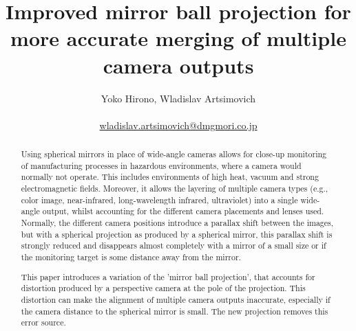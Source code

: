 \documentclass[10pt]{article}
\begin{document}
\title{Improved mirror ball projection for more accurate merging of multiple camera outputs}

\author{Yoko Hirono, Wladislav Artsimovich \\
	\\
	\href{mailto:wladislav.artsimovich@dmgmori.co.jp}{wladislav.artsimovich@dmgmori.co.jp}  \\
}

\maketitle

\begin{abstract}
	Using spherical mirrors in place of wide-angle cameras allows for close-up monitoring of manufacturing processes in hazardous environments, where a camera would normally not operate. This includes environments of high heat, vacuum and strong electromagnetic fields. Moreover, it allows the layering of multiple camera types (e.g., color image, near-infrared, long-wavelength infrared, ultraviolet) into a single wide-angle output, whilst accounting for the different camera placements and lenses used. Normally, the different camera positions introduce a parallax shift between the images, but with a spherical projection as produced by a spherical mirror, this parallax shift is strongly reduced and disappears almost completely with a mirror of a small size or if the monitoring target is some distance away from the mirror.

	This paper introduces a variation of the 'mirror ball projection', that accounts for distortion produced by a perspective camera at the pole of the projection. This distortion can make the alignment of multiple camera outputs inaccurate, especially if the camera distance to the spherical mirror is small. The new projection removes this error source.
\end{abstract}

\end{document}
